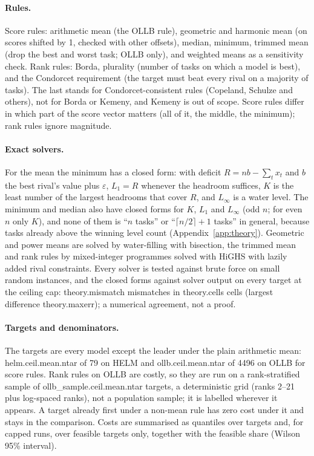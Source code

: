 \paragraph{Rules.}
Score rules: arithmetic mean (the OLLB rule), geometric and harmonic mean (on scores shifted by 1, checked with other offsets), median, minimum, trimmed mean (drop the best and worst task; OLLB only), and weighted means as a sensitivity check. Rank rules: Borda, plurality (number of tasks on which a model is best), and the Condorcet requirement (the target must beat every rival on a majority of tasks). The last stands for Condorcet-consistent rules (Copeland, Schulze and others), not for Borda or Kemeny, and Kemeny is out of scope. Score rules differ in which part of the score vector matters (all of it, the middle, the minimum); rank rules ignore magnitude.

\paragraph{Exact solvers.}
For the mean the minimum has a closed form: with deficit $R=nb-\sum_t x_t$ and $b$ the best rival's value plus $\varepsilon$, $L_1=R$ whenever the headroom suffices, $K$ is the least number of the largest headrooms that cover $R$, and $L_\infty$ is a water level. The minimum and median also have closed forms for $K$, $L_1$ and $L_\infty$ (odd $n$; for even $n$ only $K$), and none of them is ``$n$ tasks'' or ``$\lceil n/2\rceil+1$ tasks'' in general, because tasks already above the winning level count (Appendix~\ref{app:theory}). Geometric and power means are solved by water-filling with bisection, the trimmed mean and rank rules by mixed-integer programmes solved with HiGHS \citep{huangfu2018highs} with lazily added rival constraints. Every solver is tested against brute force on small random instances, and the closed forms against solver output on every target at the ceiling cap: \num{theory.mismatch} mismatches in \num{theory.cells} cells (largest difference \num{theory.maxerr}); a numerical agreement, not a proof.

\paragraph{Targets and denominators.}
The targets are every model except the leader under the plain arithmetic mean: \num{helm.ceil.mean.ntar} of 79 on HELM and \num{ollb.ceil.mean.ntar} of 4496 on OLLB for score rules. Rank rules on OLLB are costly, so they are run on a rank-stratified sample of \num{ollb_sample.ceil.mean.ntar} targets, a deterministic grid (ranks 2--21 plus log-spaced ranks), not a population sample; it is labelled wherever it appears. A target already first under a non-mean rule has zero cost under it and stays in the comparison. Costs are summarised as quantiles over targets and, for capped runs, over feasible targets only, together with the feasible share (Wilson 95\% interval).

